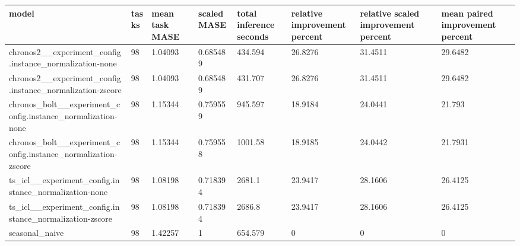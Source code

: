 \begin{tabular}{llllllll}
\toprule
model & tasks & mean task MASE & scaled MASE & total inference seconds & relative improvement percent & relative scaled improvement percent & mean paired improvement percent \\
\midrule
chronos2\_\_experiment\_config.instance\_normalization-none & 98 & 1.04093 & 0.685489 & 434.594 & 26.8276 & 31.4511 & 29.6482 \\
chronos2\_\_experiment\_config.instance\_normalization-zscore & 98 & 1.04093 & 0.685489 & 431.707 & 26.8276 & 31.4511 & 29.6482 \\
chronos\_bolt\_\_experiment\_config.instance\_normalization-none & 98 & 1.15344 & 0.759559 & 945.597 & 18.9184 & 24.0441 & 21.793 \\
chronos\_bolt\_\_experiment\_config.instance\_normalization-zscore & 98 & 1.15344 & 0.759558 & 1001.58 & 18.9185 & 24.0442 & 21.7931 \\
ts\_icl\_\_experiment\_config.instance\_normalization-none & 98 & 1.08198 & 0.718394 & 2681.1 & 23.9417 & 28.1606 & 26.4125 \\
ts\_icl\_\_experiment\_config.instance\_normalization-zscore & 98 & 1.08198 & 0.718394 & 2686.8 & 23.9417 & 28.1606 & 26.4125 \\
seasonal\_naive & 98 & 1.42257 & 1 & 654.579 & 0 & 0 & 0 \\
\bottomrule
\end{tabular}
